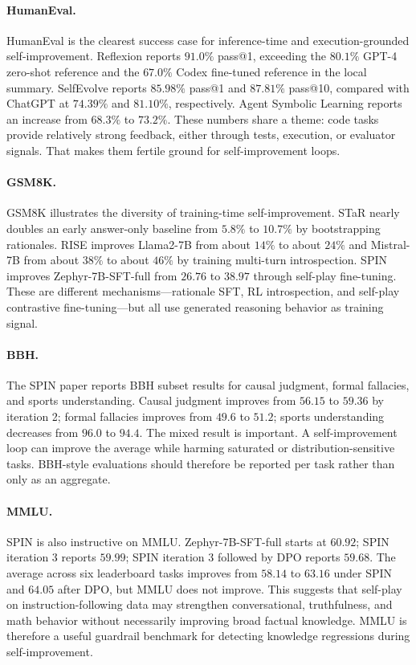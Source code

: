 \paragraph{HumanEval.} HumanEval \cite{humaneval2021} is the clearest success case for inference-time and execution-grounded self-improvement. Reflexion reports $91.0\%$ pass@1, exceeding the $80.1\%$ GPT-4 zero-shot reference and the $67.0\%$ Codex \cite{chen2021codex} fine-tuned reference in the local summary. SelfEvolve \cite{jiang2023selfevolve} reports $85.98\%$ pass@1 and $87.81\%$ pass@10, compared with ChatGPT at $74.39\%$ and $81.10\%$, respectively. Agent Symbolic Learning \cite{zhou2024agent} reports an increase from $68.3\%$ to $73.2\%$. These numbers share a theme: code tasks provide relatively strong feedback, either through tests, execution, or evaluator signals. That makes them fertile ground for self-improvement loops.

\paragraph{GSM8K.} GSM8K \cite{gsm8k2021} illustrates the diversity of training-time self-improvement. STaR \cite{zelikman2022star} nearly doubles an early answer-only baseline from $5.8\%$ to $10.7\%$ by bootstrapping rationales. RISE \cite{qu2024rise} improves Llama2-7B from about $14\%$ to about $24\%$ and Mistral-7B from about $38\%$ to about $46\%$ by training multi-turn introspection. SPIN \cite{singh2024beyond} improves Zephyr-7B-SFT-full from $26.76$ to $38.97$ through self-play fine-tuning. These are different mechanisms---rationale SFT, RL introspection, and self-play contrastive fine-tuning---but all use generated reasoning behavior as training signal.

\paragraph{BBH.} The SPIN paper reports BBH subset results for causal judgment, formal fallacies, and sports understanding. Causal judgment improves from $56.15$ to $59.36$ by iteration 2; formal fallacies improves from $49.6$ to $51.2$; sports understanding decreases from $96.0$ to $94.4$. The mixed result is important. A self-improvement loop can improve the average while harming saturated or distribution-sensitive tasks. BBH-style evaluations should therefore be reported per task rather than only as an aggregate.

\paragraph{MMLU.} SPIN is also instructive on MMLU. Zephyr-7B-SFT-full starts at $60.92$; SPIN iteration 3 reports $59.99$; SPIN iteration 3 followed by DPO reports $59.68$. The average across six leaderboard tasks improves from $58.14$ to $63.16$ under SPIN and $64.05$ after DPO, but MMLU does not improve. This suggests that self-play on instruction-following data may strengthen conversational, truthfulness, and math behavior without necessarily improving broad factual knowledge. MMLU is therefore a useful guardrail benchmark for detecting knowledge regressions during self-improvement.

